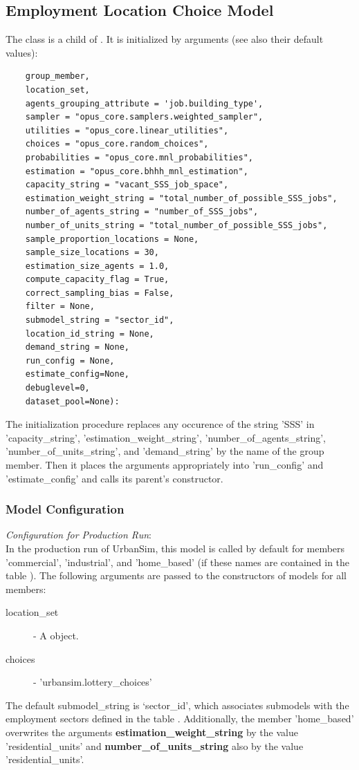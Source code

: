 \subsection{Employment Location Choice Model}
\modelsindex
\label{sec:elcm} 
%
The class  is a child of . 
It is initialized by arguments (see also their default values):
\begin{verbatim}
    group_member, 
    location_set, 
    agents_grouping_attribute = 'job.building_type',
    sampler = "opus_core.samplers.weighted_sampler", 
    utilities = "opus_core.linear_utilities", 
    choices = "opus_core.random_choices", 
    probabilities = "opus_core.mnl_probabilities", 
    estimation = "opus_core.bhhh_mnl_estimation", 
    capacity_string = "vacant_SSS_job_space",
    estimation_weight_string = "total_number_of_possible_SSS_jobs",
    number_of_agents_string = "number_of_SSS_jobs",
    number_of_units_string = "total_number_of_possible_SSS_jobs",
    sample_proportion_locations = None, 
    sample_size_locations = 30, 
    estimation_size_agents = 1.0, 
    compute_capacity_flag = True, 
    correct_sampling_bias = False,
    filter = None,
    submodel_string = "sector_id", 
    location_id_string = None,
    demand_string = None, 
    run_config = None, 
    estimate_config=None, 
    debuglevel=0, 
    dataset_pool=None):
\end{verbatim}

The initialization procedure replaces any occurence of the string 'SSS' in 'capacity_string', 'estimation_weight_string',
'number_of_agents_string', 'number_of_units_string', and 'demand_string' by the name of the group member. Then it places 
the arguments appropriately into 'run_config' and 'estimate_config' and calls its parent's constructor.

\subsubsection{Model Configuration}
\modelsindex
%
{\em Configuration for Production Run}:\\[1mm]
In the production run of UrbanSim, this model is called by default for members 'commercial', 'industrial', and 'home_based'
 (if these names are contained in the table ). 
 The following arguments are passed to the constructors of models for all members:
\begin{description}
\item[location_set] - A  object.
\item[choices] - 'urbansim.lottery_choices'
\end{description}
The default submodel_string is `sector_id', which associates submodels with the employment sectors defined in the table .  Additionally, the member 'home_based' overwrites the arguments {\bf estimation_weight_string} by the value 'residential_units' 
and {\bf number_of_units_string} also by the value 'residential_units'.

